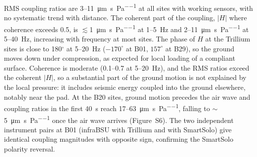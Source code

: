 \documentclass[]{seismica}
\newcommand{\suppfig}[1]{Figure~S#1}
\begin{document}
RMS coupling ratios are 3--11~\si{\micro\metre\per\second\per\pascal}
at all sites with working sensors, with no systematic trend with
distance. The coherent part of the coupling, $|H|$ where coherence
exceeds 0.5, is $\lesssim$1~\si{\micro\metre\per\second\per\pascal} at
1--5~Hz and 2--11~\si{\micro\metre\per\second\per\pascal} at 5--40~Hz,
increasing with frequency at most sites. The phase of $H$ at the
Trillium sites is close to 180$^{\circ}$ at 5--20~Hz ($-170^{\circ}$ at
B01, $157^{\circ}$ at B29), so the ground moves down under compression,
as expected for local loading of a compliant surface. Coherence is
moderate (0.1--0.7 at 5--20~Hz), and the RMS ratios exceed the coherent
$|H|$, so a substantial part of the ground motion is not explained by
the local pressure: it includes seismic energy coupled into the ground
elsewhere, notably near the pad. At the B20 sites, ground motion
precedes the air wave and coupling ratios in the first 40~s reach
17--63~\si{\micro\metre\per\second\per\pascal}, falling to
$\sim$5~\si{\micro\metre\per\second\per\pascal} once the air wave
arrives (\suppfig{6}). The two independent instrument pairs at B01
(infraBSU with Trillium and with SmartSolo) give identical coupling
magnitudes with opposite sign, confirming the SmartSolo polarity
reversal.
\end{document}
